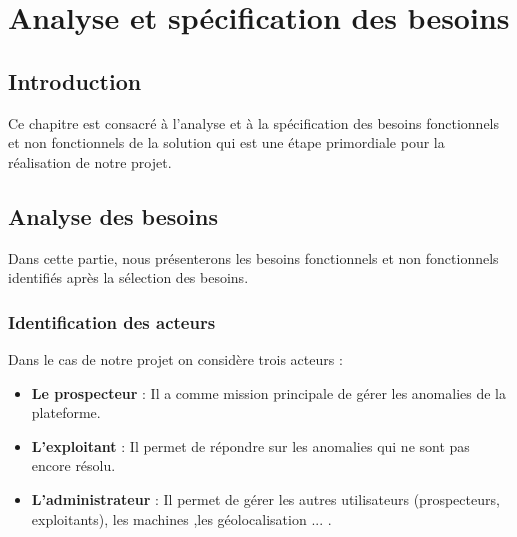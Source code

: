 \chapter{Analyse et sp\'ecification des besoins}
\section{Introduction}
Ce chapitre est consacr\'e \`a l'analyse et \`a la sp\'ecification des besoins fonctionnels et non fonctionnels de la solution qui est une \'etape primordiale pour la r\'ealisation de notre projet.
\section{Analyse des besoins}
Dans cette partie, nous pr\'esenterons les besoins fonctionnels et non fonctionnels identifi\'es apr\`es la s\'election des besoins.
\subsection{Identification des acteurs}
Dans le cas de notre projet on consid\`ere trois acteurs :
\begin{itemize}
\item \textbf{Le prospecteur} : Il a comme mission principale de g\'erer les anomalies de la plateforme.
\item \textbf{L'exploitant} : Il permet de r\'epondre sur les anomalies qui ne sont pas encore r\'esolu.
\item \textbf{L'administrateur} : Il permet de g\'erer les  autres utilisateurs (prospecteurs, exploitants), les machines ,les g\'eolocalisation ... .
\end{itemize}
